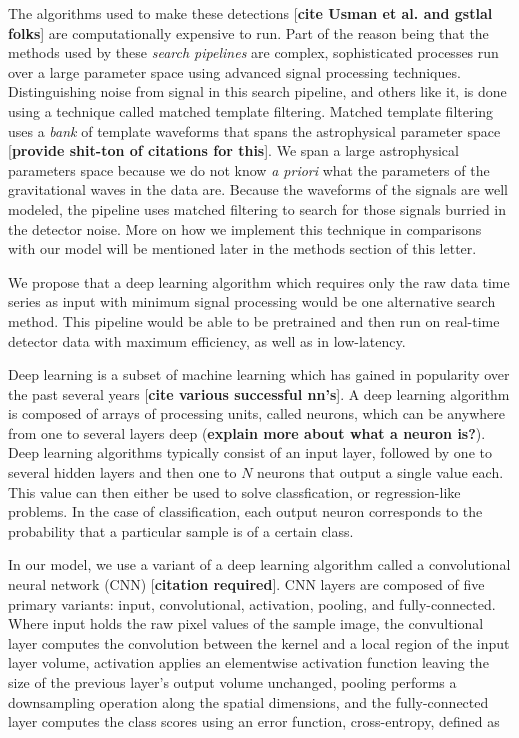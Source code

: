 \documentclass[%
 amsmath,amssymb,
 aps,
 twocolumn,
floatfix,
]{revtex4-1}
\begin{document}
The algorithms used to make these detections [\textbf{cite Usman et al. and gstlal folks}] are computationally expensive to run. Part of the reason being that the methods used by these \textit{search pipelines} are complex, sophisticated processes run over a large parameter space using advanced signal processing techniques. Distinguishing noise from signal in this search pipeline, and others like it, is done using a technique called matched template filtering. Matched template filtering uses a \textit{bank} of template waveforms that spans the astrophysical parameter space [\textbf{provide shit-ton of citations for this}]. We span a large astrophysical parameters space because we do not know \textit{a priori} what the parameters of the gravitational waves in the data are. Because the waveforms of the signals are well modeled, the pipeline uses matched filtering to search for those signals burried in the detector noise. More on how we implement this technique in comparisons with our model will be mentioned later in the methods section of this letter.

We propose that a deep learning algorithm which requires only the raw data time series as input with minimum signal processing would be one alternative search method. This pipeline would be able to be pretrained and then run on real-time detector data with maximum efficiency, as well as in low-latency.

Deep learning is a subset of machine learning which has gained in popularity over the past several years [\textbf{cite various successful nn's}]. A deep learning algorithm is composed of arrays of processing units, called neurons, which can be anywhere from one to several layers deep (\textbf{explain more about what a neuron is?}). Deep learning algorithms typically consist of an input layer, followed by one to several hidden layers and then one to $N$ neurons that output a single value each. This value can then either be used to solve classfication, or regression-like problems. In the case of classification, each output neuron corresponds to the probability that a particular sample is of a certain class. 

In our model, we use a variant of a deep learning algorithm called a convolutional neural network (CNN) [\textbf{citation required}]. CNN layers are composed of five primary variants: input, convolutional, activation, pooling, and fully-connected. Where input holds the raw pixel values of the sample image, the convultional layer computes the convolution between the kernel and a local region of the input layer volume, activation applies an elementwise activation function leaving the size of the previous layer's output volume unchanged, pooling performs a downsampling operation along the spatial dimensions, and the fully-connected layer computes the class scores using an error function, cross-entropy, defined as
\end{document}
